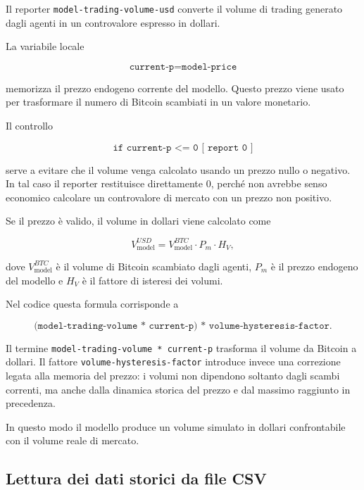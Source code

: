 Il reporter \texttt{model-trading-volume-usd} converte il volume di trading
generato dagli agenti in un controvalore espresso in dollari.

La variabile locale

\[
\texttt{current-p} = \texttt{model-price}
\]

memorizza il prezzo endogeno corrente del modello. Questo prezzo viene usato per
trasformare il numero di Bitcoin scambiati in un valore monetario.

Il controllo

\[
\texttt{if current-p <= 0 [ report 0 ]}
\]

serve a evitare che il volume venga calcolato usando un prezzo nullo o negativo.
In tal caso il reporter restituisce direttamente \(0\), perché non avrebbe senso
economico calcolare un controvalore di mercato con un prezzo non positivo.

Se il prezzo è valido, il volume in dollari viene calcolato come

\[
V_{\mathrm{model}}^{USD}
=
V_{\mathrm{model}}^{BTC}
\cdot
P_m
\cdot
H_V,
\]

dove \(V_{\mathrm{model}}^{BTC}\) è il volume di Bitcoin scambiato dagli agenti,
\(P_m\) è il prezzo endogeno del modello e \(H_V\) è il fattore di isteresi dei
volumi.

Nel codice questa formula corrisponde a

\[
\texttt{(model-trading-volume * current-p) * volume-hysteresis-factor}.
\]

Il termine \texttt{model-trading-volume * current-p} trasforma il volume da
Bitcoin a dollari. Il fattore \texttt{volume-hysteresis-factor} introduce invece
una correzione legata alla memoria del prezzo: i volumi non dipendono soltanto
dagli scambi correnti, ma anche dalla dinamica storica del prezzo e dal massimo
raggiunto in precedenza.

In questo modo il modello produce un volume simulato in dollari confrontabile con
il volume reale di mercato.

\subsection{Lettura dei dati storici da file CSV}

